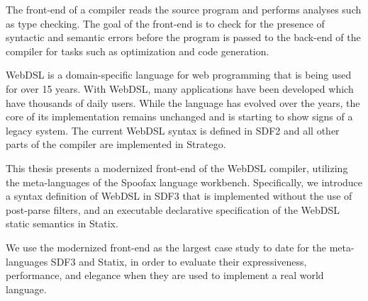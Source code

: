 
The front-end of a compiler reads the source program and performs analyses such as type checking. The goal of the front-end is to check for the presence of syntactic and semantic errors before the program is passed to the back-end of the compiler for tasks such as optimization and code generation.

WebDSL is a domain-specific language for web programming that is being used for over 15 years. With WebDSL, many applications have been developed which have thousands of daily users. While the language has evolved over the years, the core of its implementation remains unchanged and is starting to show signs of a legacy system. The current WebDSL syntax is defined in SDF2 and all other parts of the compiler are implemented in Stratego.

This thesis presents a modernized front-end of the WebDSL compiler, utilizing the meta-languages of the Spoofax language workbench. Specifically, we introduce a syntax definition of WebDSL in SDF3 that is implemented without the use of post-parse filters, and an executable declarative specification of the WebDSL static semantics in Statix.

We use the modernized front-end as the largest case study to date for the meta-languages SDF3 and Statix, in order to evaluate their expressiveness, performance, and elegance when they are used to implement a real world language.
